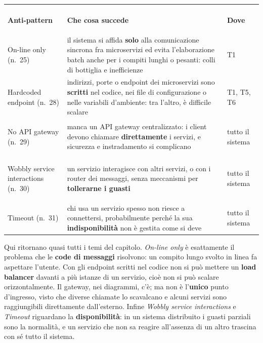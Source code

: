 \begin{center}
\renewcommand{\arraystretch}{1.3}
\begin{tabular}{@{}>{\bfseries\raggedright\arraybackslash}p{3.7cm} >{\raggedright\arraybackslash}p{9.6cm}
                >{\raggedright\arraybackslash}p{2.1cm}@{}}
  \toprule
  \multicolumn{3}{@{}l}{\textcolor{swteal}{\textbf{Interazione fra servizi}}} \\
  \normalfont\textbf{Anti-pattern} & \textbf{Che cosa succede} & \textbf{Dove} \\
  \midrule
  On-line only (n.~25) & il sistema si affida \textbf{solo} alla comunicazione sincrona fra microservizi ed evita
    l'elaborazione batch anche per i compiti lunghi o pesanti: colli di bottiglia e inefficienze & T1 \\
  Hardcoded endpoint (n.~28) & indirizzi, porte o endpoint dei microservizi sono \textbf{scritti} nel codice, nei file di
    configurazione o nelle variabili d'ambiente: tra l'altro, è difficile scalare & T1, T5, T6 \\
  No API gateway (n.~29) & manca un API gateway centralizzato: i client devono chiamare \textbf{direttamente} i servizi,
    e sicurezza e instradamento si complicano & tutto il sistema \\
  Wobbly service interactions (n.~30) & un servizio interagisce con altri servizi, o con i router dei messaggi, senza
    meccanismi per \textbf{tollerarne i guasti} & tutto il sistema \\
  Timeout (n.~31) & chi usa un servizio spesso non riesce a connettersi, probabilmente perché la sua
    \textbf{indisponibilità} non è gestita come si deve & tutto il sistema \\
  \bottomrule
\end{tabular}
\end{center}

Qui ritornano quasi tutti i temi del capitolo. \textit{On-line only} è esattamente il problema che le \textbf{code di
messaggi} risolvono: un compito lungo svolto in linea fa aspettare l'utente. Con gli endpoint scritti nel codice non si
può mettere un \textbf{load balancer} davanti a più istanze di un servizio, cioè non si può scalare orizzontalmente. Il
gateway, nei diagrammi, c'è; ma non è l'\textbf{unico} punto d'ingresso, visto che diverse chiamate lo scavalcano e
alcuni servizi sono raggiungibili direttamente dall'esterno. Infine \textit{Wobbly service interactions} e
\textit{Timeout} riguardano la \textbf{disponibilità}: in un sistema distribuito i guasti parziali sono la normalità, e un
servizio che non sa reagire all'assenza di un altro trascina con sé tutto il sistema.

